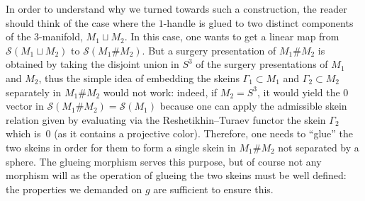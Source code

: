 \documentclass[pdftex]{sigma}
\numberwithin{equation}{section}
\numberwithin{theorem}{section}
\numberwithin{proposition}{section}
\numberwithin{definition}{section}
\numberwithin{lemma}{section}
\numberwithin{corollary}{section}
\numberwithin{remark}{section}
\numberwithin{example}{section}
\newcommand{\TSkein}{{\mathscr{S}}}
\begin{document}
\begin{remark}
 In order to understand why we turned towards such a construction,
 the reader should think of the case where the $1$-handle is glued to
 two distinct components of the $3$-manifold, $M_1\sqcup M_2$. In
 this case, one wants to get a linear map from
 $\TSkein(M_1\sqcup M_2)$ to $\TSkein(M_1\#M_2)$. But a surgery
 presentation of $M_1\#M_2$ is obtained by taking the disjoint union
 in $S^3$ of the surgery presentations of $M_1$ and $M_2$, thus the
 simple idea of embedding the skeins $\Gamma_1\subset M_1$ and
 $\Gamma_2\subset M_2$
 separately in $M_1\#M_2$ would not work: indeed, if $M_2=S^3$, it would yield the $0$ vector in
 $\TSkein(M_1\#M_2)=\TSkein(M_1)$ because one can apply the admissible skein
 relation given by evaluating via the Reshetikhin--Turaev functor the
 skein $\Gamma_2$ which is~$0$ (as it contains a projective color).
 Therefore, one needs to ``glue'' the two skeins in order for them to
 form a single skein in $M_1\#M_2$ not separated by a sphere. The
 glueing morphism serves this purpose, but of course not any morphism
 will as the operation of glueing the two skeins must be well
 defined: the properties we demanded on $g$ are sufficient to ensure
 this.
\end{remark}
\end{document}
